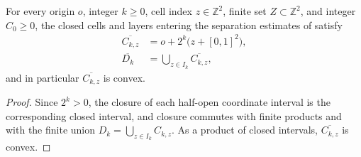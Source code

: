 \begin{lemma}
    \label{thm:area_law_dyadic_closures}
    \leanok
    For every origin $o$, integer $k\ge0$, cell index $z\in\mathbb Z^2$,
    finite set $Z\subset\mathbb Z^2$, and integer $C_0\ge0$, the closed cells
    and layers entering the separation estimates of
    \cite[Section~11]{OpenAI2026AreaLaw} satisfy
    \begin{align}
        \overline{C_{k,z}} & =o+2^k\bigl(z+[0,1]^2\bigr),           \\
        \overline{D_k}     & =\bigcup_{z\in I_k}\overline{C_{k,z}},
    \end{align}
    and in particular $\overline{C_{k,z}}$ is convex.
\end{lemma}
\begin{proof}\leanok
    Since $2^k>0$, the closure of each half-open coordinate interval is the
    corresponding closed interval, and closure commutes with finite products
    and with the finite union $D_k=\bigcup_{z\in I_k}C_{k,z}$. As a product of
    closed intervals, $\overline{C_{k,z}}$ is convex.
\end{proof}
